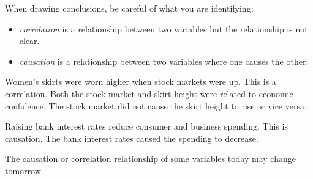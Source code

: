 When drawing conclusions, be careful of what you are identifying:
\begin{itemize}
    \item \begin{definition} \emph{correlation} is a relationship between two variables but the relationship is not clear.\end{definition}
    \item \begin{definition} \emph{causation} is a relationship between two variables where one causes the other.\end{definition}
\end{itemize}
\begin{example}
    Women's skirts were worn higher when stock markets were up. This is a correlation. Both the stock market and skirt height were related to economic confidence. The stock market did not cause the skirt height to rise or vice versa.
\end{example}
\begin{example}
    Raising bank interest rates reduce consumer and business spending. This is causation. The bank interest rates caused the spending to decrease.
\end{example}
The causation or correlation relationship of some variables today may change tomorrow.